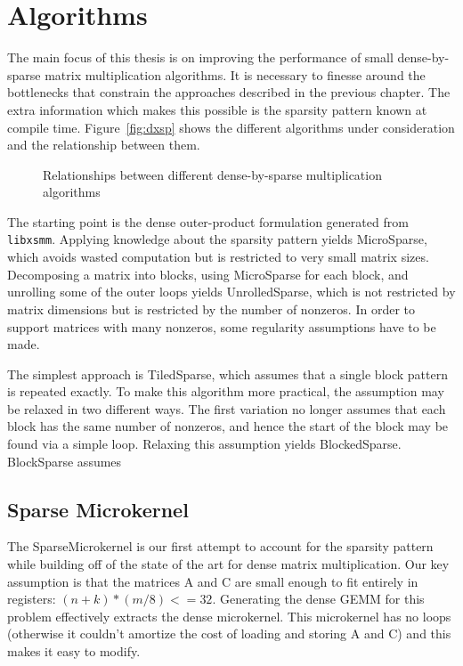 \chapter{Algorithms}
\label{chapter:algs}

The main focus of this thesis is on improving the performance of small dense-by-sparse matrix multiplication algorithms. It is necessary to finesse around the bottlenecks that constrain the approaches described in the previous chapter. The extra information which makes this possible is the sparsity pattern known at compile time. Figure~\ref{fig:dxsp} shows the different algorithms under consideration and the relationship between them. 

\begin{figure}[H]
  \centering
  
  \label{fig:dxspfamilies}
  \caption{Relationships between different dense-by-sparse multiplication algorithms}
\end{figure}


The starting point is the dense outer-product formulation generated from \texttt{libxsmm}. Applying knowledge about the sparsity pattern yields MicroSparse, which avoids wasted computation but is restricted to very small matrix sizes. Decomposing a matrix into blocks, using MicroSparse for each block, and unrolling some of the outer loops yields UnrolledSparse, which is not restricted by matrix dimensions but is restricted by the number of nonzeros. In order to support matrices with many nonzeros, some regularity assumptions have to be made. 


The simplest approach is TiledSparse, which assumes that a single block pattern is repeated exactly. To make this algorithm more practical, the assumption may be relaxed in two different ways. The first variation no longer assumes that each block has the same number of nonzeros, and hence the start of the block may be found via a simple loop. Relaxing this assumption yields BlockedSparse. BlockSparse assumes 




\section{Sparse Microkernel}

The SparseMicrokernel is our first attempt to account for the sparsity pattern while building off of the state of the art for dense matrix multiplication. Our key assumption is that the matrices A and C are small enough to fit entirely in registers: $(n + k) * (m/8) <= 32$. Generating the dense GEMM for this problem effectively extracts the dense microkernel. This microkernel has no loops (otherwise it couldn't amortize the cost of loading and storing A and C) and this makes it easy to modify.

